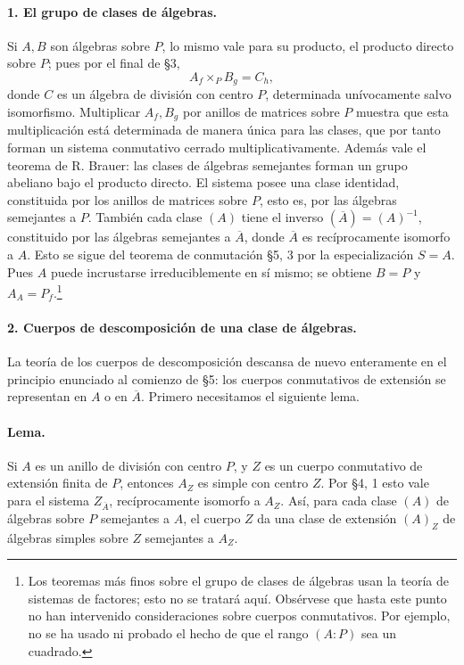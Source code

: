 \paragraph{1. El grupo de clases de álgebras.}
Si \(A,B\) son álgebras sobre \(P\), lo mismo vale para su producto, el producto directo sobre \(P\); pues por el final de §3,
\[
        A_f\times_P B_g=C_h,
\]
donde \(C\) es un álgebra de división con centro \(P\), determinada unívocamente salvo isomorfismo. Multiplicar \(A_f,B_g\) por anillos de matrices sobre \(P\) muestra que esta multiplicación está determinada de manera única para las clases, que por tanto forman un sistema conmutativo cerrado multiplicativamente. Además vale el teorema de R. Brauer: las clases de álgebras semejantes forman un grupo abeliano bajo el producto directo. El sistema posee una clase identidad, constituida por los anillos de matrices sobre \(P\), esto es, por las álgebras semejantes a \(P\). También cada clase \((A)\) tiene el inverso \((\overline A)=(A)^{-1}\), constituido por las álgebras semejantes a \(\overline A\), donde \(\overline A\) es recíprocamente isomorfo a \(A\). Esto se sigue del teorema de conmutación §5, 3 por la especialización \(S=A\). Pues \(A\) puede incrustarse irreduciblemente en sí mismo; se obtiene \(B=P\) y \(A_A=P_f\).\footnote{Los teoremas más finos sobre el grupo de clases de álgebras usan la teoría de sistemas de factores; esto no se tratará aquí. Obsérvese que hasta este punto no han intervenido consideraciones sobre cuerpos conmutativos. Por ejemplo, no se ha usado ni probado el hecho de que el rango \((A:P)\) sea un cuadrado.}

\paragraph{2. Cuerpos de descomposición de una clase de álgebras.}
La teoría de los cuerpos de descomposición descansa de nuevo enteramente en el principio enunciado al comienzo de §5: los cuerpos conmutativos de extensión se representan en \(A\) o en \(\overline A\). Primero necesitamos el siguiente lema.

\paragraph{Lema.}
Si \(A\) es un anillo de división con centro \(P\), y \(Z\) es un cuerpo conmutativo de extensión finita de \(P\), entonces \(A_Z\) es simple con centro \(Z\). Por §4, 1 esto vale para el sistema \(Z_{\overline A}\), recíprocamente isomorfo a \(A_Z\). Así, para cada clase \((A)\) de álgebras sobre \(P\) semejantes a \(A\), el cuerpo \(Z\) da una clase de extensión \((A)_Z\) de álgebras simples sobre \(Z\) semejantes a \(A_Z\).

